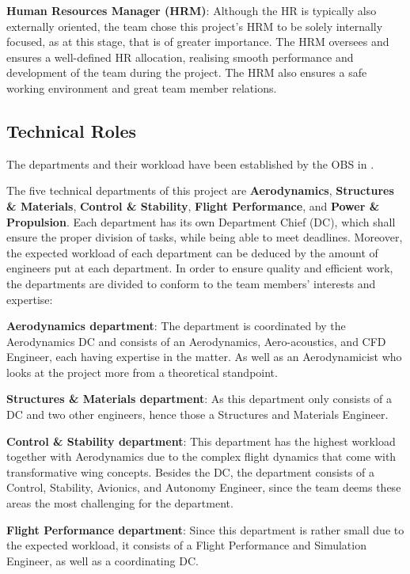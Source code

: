 \textbf{Human Resources Manager (HRM)}: Although the HR is typically also externally oriented, the team chose this project's HRM to be solely internally focused, as at this stage, that is of greater importance.
The HRM oversees and ensures a well-defined HR allocation, realising smooth performance and development of the team during the project.
The HRM also ensures a safe working environment and great team member relations.

\subsection{Technical Roles}\label{sec:technical-roles}
The departments and their workload have been established by the OBS in .

The five technical departments of this project are \textbf{Aerodynamics}, \textbf{Structures \& Materials}, \textbf{Control \& Stability}, \textbf{Flight Performance}, and \textbf{Power \& Propulsion}.
Each department has its own Department Chief (DC), which shall ensure the proper division of tasks, while being able to meet deadlines.
Moreover, the expected workload of each department can be deduced by the amount of engineers put at each department. 
In order to ensure quality and efficient work, the departments are divided to conform to the team members' interests and expertise:

\textbf{Aerodynamics department}: The department is coordinated by the Aerodynamics DC and consists of an Aerodynamics, Aero-acoustics, and CFD Engineer, each having expertise in the matter.
As well as an Aerodynamicist who looks at the project more from a theoretical standpoint.

\textbf{Structures \& Materials department}: As this department only consists of a DC and two other engineers, hence those a Structures and Materials Engineer.

\textbf{Control \& Stability department}: This department has the highest workload together with Aerodynamics due to the complex flight dynamics that come with transformative wing concepts.
Besides the DC, the department consists of a Control, Stability, Avionics, and Autonomy Engineer, since the team deems these areas the most challenging for the department.

\textbf{Flight Performance department}: Since this department is rather small due to the expected workload, it consists of a Flight Performance and Simulation Engineer, as well as a coordinating DC.

